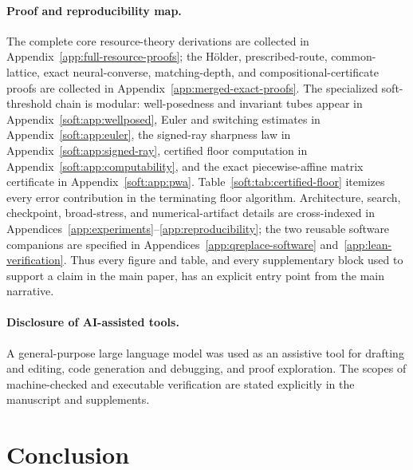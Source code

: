 \documentclass[twoside,11pt]{article}
\begin{document}
\paragraph{Proof and reproducibility map.}
The complete core resource-theory derivations are collected in Appendix~\ref{app:full-resource-proofs}; the H\"older, prescribed-route, common-lattice, exact neural-converse, matching-depth, and compositional-certificate proofs are collected in Appendix~\ref{app:merged-exact-proofs}.  The specialized soft-threshold chain is modular: well-posedness and invariant tubes appear in Appendix~\ref{soft:app:wellposed}, Euler and switching estimates in Appendix~\ref{soft:app:euler}, the signed-ray sharpness law in Appendix~\ref{soft:app:signed-ray}, certified floor computation in Appendix~\ref{soft:app:computability}, and the exact piecewise-affine matrix certificate in Appendix~\ref{soft:app:pwa}.  Table~\ref{soft:tab:certified-floor} itemizes every error contribution in the terminating floor algorithm.  Architecture, search, checkpoint, broad-stress, and numerical-artifact details are cross-indexed in Appendices~\ref{app:experiments}--\ref{app:reproducibility}; the two reusable software companions are specified in Appendices~\ref{app:qreplace-software} and~\ref{app:lean-verification}.  Thus every figure and table, and every supplementary block used to support a claim in the main paper, has an explicit entry point from the main narrative.

\paragraph{Disclosure of AI-assisted tools.} A general-purpose large language model was used as an assistive tool for drafting and editing, code generation and debugging, and proof exploration. The scopes of machine-checked and executable verification are stated explicitly in the manuscript and supplements.

\section{Conclusion}
\label{sec:conclusion-main}
\end{document}
